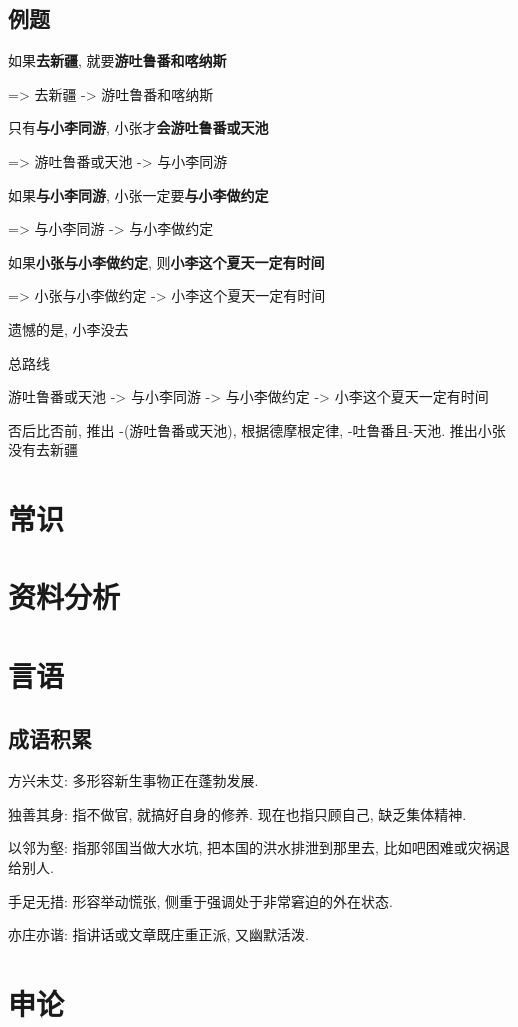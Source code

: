 \documentclass[UTF8]{ctexart}
\begin{document}
\subsection{例题}
如果\textbf{去新疆}, 就要\textbf{游吐鲁番和喀纳斯}

=> 去新疆 -> 游吐鲁番和喀纳斯

只有\textbf{与小李同游}, 小张才\textbf{会游吐鲁番或天池}

=> 游吐鲁番或天池 -> 与小李同游

如果\textbf{与小李同游}, 小张一定要\textbf{与小李做约定}

=> 与小李同游 -> 与小李做约定

如果\textbf{小张与小李做约定}, 则\textbf{小李这个夏天一定有时间}

=> 小张与小李做约定 -> 小李这个夏天一定有时间

遗憾的是, 小李没去

总路线

游吐鲁番或天池 -> 与小李同游 -> 与小李做约定 -> 小李这个夏天一定有时间

否后比否前, 推出 -(游吐鲁番或天池), 根据德摩根定律, -吐鲁番且-天池. 推出小张没有去新疆

\section{常识}


\section{资料分析}

\section{言语}

\subsection{成语积累}
方兴未艾: 多形容新生事物正在蓬勃发展.

独善其身: 指不做官, 就搞好自身的修养. 现在也指只顾自己, 缺乏集体精神.

以邻为壑: 指那邻国当做大水坑, 把本国的洪水排泄到那里去, 比如吧困难或灾祸退给别人.

手足无措: 形容举动慌张, 侧重于强调处于非常窘迫的外在状态.

亦庄亦谐: 指讲话或文章既庄重正派, 又幽默活泼.

\section{申论}
\end{document}
